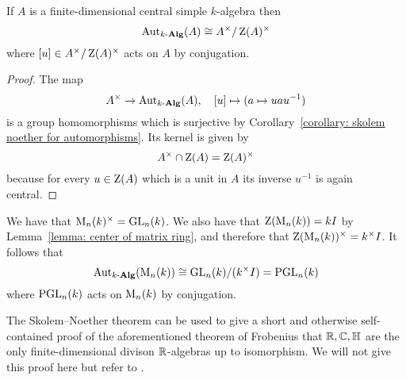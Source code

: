 \begin{corollary}
  If $A$ is a finite-dimensional central simple $k$-algebra then
  \[
          \operatorname{Aut}_{k\text{-}\mathbf{Alg}}(A)
    \cong A^\times / \operatorname{Z}(A)^\times
  \]
  where $[u] \in A^\times / \operatorname{Z}(A)^\times$ acts on $A$ by conjugation.
\end{corollary}


\begin{proof}
  The map
  \[
            A^\times
    \to     \operatorname{Aut}_{k\text{-}\mathbf{Alg}}(A),
    \quad   [u]
    \mapsto (a \mapsto u a u^{-1})
  \]
  is a group homomorphisms which is surjective by Corollary~\ref{corollary: skolem noether for automorphisms}.
  Its kernel is given by
  \[
      A^\times \cap \operatorname{Z}(A)
    = \operatorname{Z}(A)^\times
  \]
  because for every $u \in \operatorname{Z}(A)$ which is a unit in $A$ its inverse $u^{-1}$ is again central.
\end{proof}


\begin{example}
  We have that $\operatorname{M}_n(k)^\times = \operatorname{GL}_n(k)$.
  We also have that $\operatorname{Z}(\operatorname{M}_n(k)) = k I$ by Lemma~\ref{lemma: center of matrix ring}, and therefore that $\operatorname{Z}(\operatorname{M}_n(k))^\times = k^\times I$.
  It follows that
  \[
          \operatorname{Aut}_{k\text{-}\mathbf{Alg}}(\operatorname{M}_n(k))
    \cong \operatorname{GL}_n(k) / (k^\times I)
    =     \operatorname{PGL}_n(k)
  \]
  where $\operatorname{PGL}_n(k)$ acts on $\operatorname{M}_n(k)$ by conjugation.
\end{example}


\begin{remark}
  The Skolem--Noether theorem can be used to give a short and otherwise self-contained proof of the aforementioned theorem of Frobenius that $\mathbb{R}, \mathbb{C}, \mathbb{H}$ are the only finite-dimensional divison $\mathbb{R}$-algebras up to isomorphism.
  We will not give this proof here but refer to \cite[Theorem 2.50]{Knapp2016Advanced}.
\end{remark}



